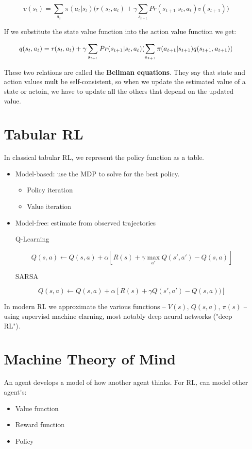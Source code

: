 \documentclass[11pt]{article}
\begin{document}
\[
v(s_t ) = \sum_{a_t} \pi(a_t | s_t) \big( r(s_t, a_t) + \gamma \sum_{s_{t+1}} Pr(s_{t+1} | s_t, a_t) v(s_{t+1})  \big)
\]

If we substitute the state value function into the action value function we get:

\[
q(s_t, a_t) = r(s_t, a_t) + \gamma \sum_{s_{t+1}} Pr(s_{t+1} | s_t, a_t) \Huge( \sum_{a_{t+1}} \pi(a_{t+1} | s_{t+1}) q(s_{t+1}, a_{t+1})  \Huge)
\]

These two relations are called the \textbf{Bellman equations}.  They say that state and action values mult be self-consistent, so when we update the estimated value of a state or actoin, we have to update all the others that depend on the updated value.
\section{Tabular RL}
\label{sec:orgb3034a4}

In classical tabular RL, we represent the policy function as a table.

\begin{itemize}
\item Model-based: use the MDP to solve for the best policy.

\begin{itemize}
\item Policy iteration
\item Value iteration
\end{itemize}

\item Model-free: estimate from observed trajectories

Q-Learning

\begin{equation}
Q(s, a) \gets Q(s, a) + \alpha [R(s) + \gamma \max_{a'} Q(s', a') - Q(s, a)]
\end{equation}

SARSA

\begin{equation}
Q(s, a) \leftarrow Q(s, a) + \alpha [R(s) + \gamma Q(s', a') - Q(s, a))]
\end{equation}
\end{itemize}

In modern RL we approximate the various functions -- \(V(s)\), \(Q(s, a)\), \(\pi(s)\) -- using supervisd machine elarning, most notably deep neural networks ("deep RL").
\section{Machine Theory of Mind}
\label{sec:org5ea01e4}

An agent develops a model of how another agent thinks.  For RL, can model other agent's:

\begin{itemize}
\item Value function
\item Reward function
\item Policy
\end{itemize}
\end{document}
